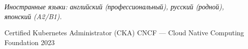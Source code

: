 \documentclass[10pt, a4paper]{awesome-cv}
\begin{document}
\vspace{2pt}
\textit{\small Иностранные языки: английский (профессиональный), русский (родной), японский (A2/B1).}


\begin{cvhonors}
  \cvhonor
    {Certified Kubernetes Administrator (CKA)}
    {CNCF --- Cloud Native Computing Foundation}
    {}
    {2023}
\end{cvhonors}

\end{document}
